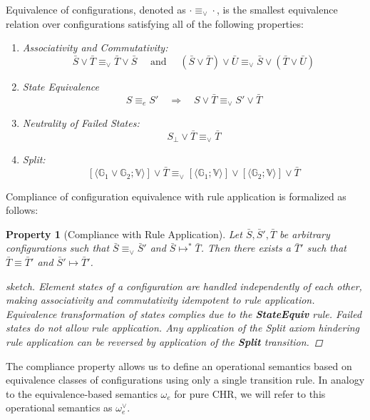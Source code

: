 \documentclass[acmtocl]{acmtrans2m}
\newtheorem{property}[theorem]{Property}
\newcommand\state[1]{\langle #1 \rangle}
\newcommand\equv{\equiv_\vee}
\newcommand{\oesqv}{\ensuremath{\omega^\vee_e}}
\newcommand{\V}{\ensuremath{\mathbb{V}}}
\newcommand{\G}{\ensuremath{\mathbb{G}}}
\newcommand{\bS}{\bar{S}}
\newcommand{\bT}{\bar{T}}
\newcommand{\bU}{\bar{U}}
\newcommand{\oesq}{\ensuremath{\omega_{e}}}
\begin{document}
\begin{definition}
\label{def:vee-config-equiv}
Equivalence of configurations, denoted as $\cdot\equiv_\vee\cdot$, is the
smallest equivalence relation over configurations satisfying all of the following
properties:
  \begin{enumerate}
      \item \label{cond:vce_ac}
	\emph{Associativity and Commutativity:}
      \[
        \bS \vee \bT
          \equiv_\vee
        \bT \vee \bS
	\quad\textrm{ and }\quad
        (\bS \vee \bT) \vee \bU
          \equiv_\vee
        \bS \vee (\bT \vee \bU)
      \]
      \item \label{cond:vce_steq}
	\emph{State Equivalence}
      \[
        S\equiv_e S'
		\quad\Rightarrow\quad
        S\vee\bT\equv S'\vee\bT
      \]
      \item \label{cond:vce_fail}
	\emph{Neutrality of Failed States:}
      \[
        S_{\bot}\vee\bT
          \equiv_\vee
        \bT
      \]
      \item \label{cond:vce_split}
	\emph{Split:}
      \[
        [\state{\G_1\vee \G_2;\V}] \vee \bT
          \equiv_\vee
        [\state{\G_1;\V}] \vee [\state{\G_2;\V}] \vee \bT
      \]
  \end{enumerate}
\end{definition}

Compliance of configuration equivalence with rule application is formalized as
follows:

\begin{property}[Compliance with Rule Application] Let
$\bS,\bS',\bT$ be arbitrary configurations such that $\bS\equv\bS'$ and
$\bS\mapsto^{*}\bT$. Then there exists a $\bT'$ such that $\bT\equiv\bT'$ and
$\bS'\mapsto\bT'$. \begin{proof}[sketch] Element states of a configuration
are handled independently of each other, making associativity and commutativity
idempotent to rule application. Equivalence transformation of states complies due
to the \textbf{StateEquiv} rule. Failed states do not allow rule
application. Any application of the
\emph{Split} axiom hindering rule application can be reversed by application of
the \textbf{Split} transition.
\end{proof}
\end{property}

The compliance property allows us to define an operational semantics based on
equivalence classes of configurations using only a single transition rule. In
analogy to the equivalence-based semantics $\oesq$ for pure CHR, we will refer
to this operational semantics as $\oesqv$.
\end{document}
